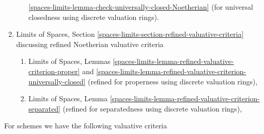 \begin{enumerate}
\begin{enumerate}
\ref{spaces-limits-lemma-check-universally-closed-Noetherian}
(for universal closedness using discrete valuation rings).
\end{enumerate}
\item Limits of Spaces, Section
\ref{spaces-limits-section-refined-valuative-criteria}
discussing refined Noetherian valuative criteria
\begin{enumerate}
\item Limits of Spaces, Lemmas
\ref{spaces-limits-lemma-refined-valuative-criterion-proper} and
\ref{spaces-limits-lemma-refined-valuative-criterion-universally-closed}
(refined for properness using discrete valuation rings),
\item Limits of Spaces, Lemma
\ref{spaces-limits-lemma-refined-valuative-criterion-separated}
(refined for separatedness using discrete valuation rings),
\end{enumerate}
\end{enumerate}
For schemes we have the following valuative criteria
